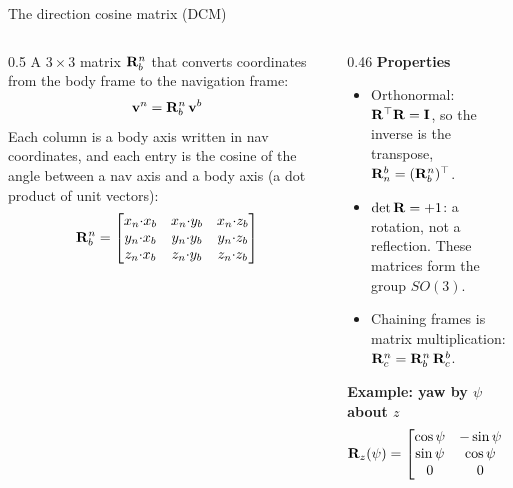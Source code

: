 \begin{frame}{The direction cosine matrix (DCM)}
  \begin{columns}[T]
    \begin{column}{0.5\textwidth}
      \small
      A $3\times3$ matrix $\mathbf{R}^n_b$ that converts coordinates from the body frame to the navigation frame:
      \[
        \mathbf{v}^n = \mathbf{R}^n_b\,\mathbf{v}^b
      \]
      Each column is a body axis written in nav coordinates, and each entry is the cosine of the angle between a nav axis and a body axis (a dot product of unit vectors):
      \[
        \mathbf{R}^n_b =
        \begin{bmatrix}
          x_n{\cdot}x_b & x_n{\cdot}y_b & x_n{\cdot}z_b\\
          y_n{\cdot}x_b & y_n{\cdot}y_b & y_n{\cdot}z_b\\
          z_n{\cdot}x_b & z_n{\cdot}y_b & z_n{\cdot}z_b
        \end{bmatrix}
      \]
    \end{column}
    \begin{column}{0.46\textwidth}
      \footnotesize
      \textbf{Properties}
      \begin{itemize}
        \item Orthonormal: $\mathbf{R}^\top\mathbf{R}=\mathbf{I}$, so the inverse is the transpose, $\mathbf{R}^b_n=(\mathbf{R}^n_b)^\top$.
        \item $\det\mathbf{R}=+1$: a rotation, not a reflection. These matrices form the group $SO(3)$.
        \item Chaining frames is matrix multiplication: $\mathbf{R}^n_c=\mathbf{R}^n_b\,\mathbf{R}^b_c$.
      \end{itemize}
      \textbf{Example: yaw by $\psi$ about $z$}
      \[
        \mathbf{R}_z(\psi)=\begin{bmatrix}\cos\psi&-\sin\psi&0\\ \sin\psi&\cos\psi&0\\ 0&0&1\end{bmatrix}
      \]
    \end{column}
  \end{columns}
\end{frame}

